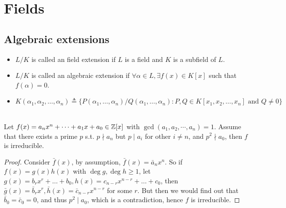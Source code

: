 \section{Fields}

\subsection{Algebraic extensions}

\begin{definition} \hfill
  \begin{itemize}
    \item $L / K$ is called an field extension if $L$ is a field and $K$ is a subfield of $L$.
    \item $L / K$ is called an algebraic extension if $\forall \alpha \in L, \exists f(x) \in K[x]$
      such that $f(\alpha) = 0$.
    \item $K(\alpha_1, \alpha_2, \dots, \alpha_n) \triangleq \big\{ P(\alpha_1, \dots, \alpha_n)
      / Q(\alpha_1, \dots, \alpha_n) : P, Q \in K[x_1, x_2, \dots, x_n] \text{ and } Q \neq 0 \big\}$
  \end{itemize}
\end{definition}

\begin{theorem} \mbox{} \\
  Let $f(x) = a_n x^n + \dots + a_1 x + a_0 \in \mathbb{Z}[x]$ with $\gcd(a_1, a_2, \cdots, a_n) = 1$.
  Assume that there exists a prime $p$ s.t. $p \nmid a_n$ but $p \mid a_i$ for other $i \neq n$,
  and $p^2 \nmid a_0$, then $f$ is irreducible.

  \begin{proof}
    Consider $\bar{f}(x)$, by assumption, $\bar{f}(x) = \bar{a}_n x^n$. So if $f(x) = g(x) h(x)$
    with $\deg g, \deg h \geq 1$, let $g(x) = b_r x^r + \dots + b_0, h(x) = c_{n-r} x^{n-r} + \dots + c_0$,
    then $\bar{g}(x) = \bar{b}_r x^r, \bar{h}(x) = \bar{c}_{n-r} x^{n-r}$ for some
    $r$. But then we would find out that $\bar{b}_0 = \bar{c}_0 = 0$, and thus $p^2 \mid a_0$,
    which is a contradiction, hence $f$ is irreducible.
  \end{proof}
\end{theorem}

